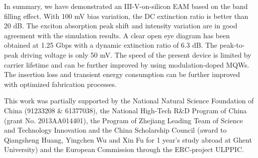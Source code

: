 \documentclass[aip,apl,preprint,a4paper]{revtex4-1}
\begin{document}
In summary, we have demonstrated an III-V-on-silicon EAM based on the band filling effect. With 100 mV bias variation, the DC extinction ratio is better than 20 dB. The exciton absorption peak shift and intensity variation are in good agreement with the simulation results. A clear open eye diagram has been obtained at 1.25 Gbps with a dynamic extinction ratio of 6.3 dB. The peak-to-peak driving voltage is only 50 mV. The speed of the present device is limited by carrier lifetime and can be further improved by using modulation-doped MQWs. The insertion loss and transient energy consumption can be further improved with optimized fabrication processes. 

\begin{acknowledgments}
This work was partially supported by the National Natural Science Foundation of China (91233208 \& 61377038), the National High-Tech R\&D Program of China (grant No. 2013AA014401), the Program of Zhejiang Leading Team of Science and Technology Innovation and the China Scholarship Council (award to Qiangsheng Huang, Yingchen Wu and Xin Fu for 1 year’s study abroad at Ghent University) and the European Commission through the ERC-project ULPPIC.
\end{acknowledgments}


\end{document}
